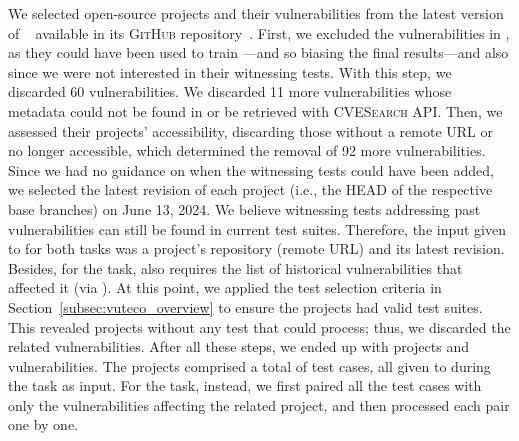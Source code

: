 We selected open-source \Java projects and their vulnerabilities from the latest version of \projectKB~\cite{ponta:msr2019:projectkb} available in its \textsc{GitHub} repository~\cite{projectkb:github}.
First, we excluded the vulnerabilities in \VulforJ, as they could have been used to train \vuteco---and so biasing the final results---and also since we were not interested in their witnessing tests.
With this step, we discarded 60 vulnerabilities.
We discarded 11 more vulnerabilities whose metadata could not be found in \projectKB or be retrieved with \textsc{CVESearch} API.
Then, we assessed their projects' accessibility, discarding those without a remote URL or no longer accessible, which determined the removal of 92 more vulnerabilities.
%
Since we had no guidance on when the witnessing tests could have been added, we selected the latest revision of each project (i.e., the HEAD of the respective base branches) on June 13, 2024.
We believe witnessing tests addressing past vulnerabilities can still be found in current test suites.
Therefore, the input given to \vuteco for both tasks was a project's repository (remote URL) and its latest revision.
Besides, for the \matching task, \vuteco also requires the list of historical vulnerabilities that affected it (via \projectKB).
%
At this point, we applied the test selection criteria in Section~\ref{subsec:vuteco_overview} to ensure the projects had valid test suites.
This revealed \invivoProjectsWithNoTests projects without any test that \vuteco could process; thus, we discarded the related \vulnsWithNoTests vulnerabilities.
%
After all these steps, we ended up with \invivoProjects projects and \invivoVulns vulnerabilities.
%
The \invivoProjects projects comprised a total of \invivoTests test cases, all given to \vuteco during the \finding task as input.
For the \matching task, instead, we first paired all the test cases with only the vulnerabilities affecting the related project, and then \vuteco processed each pair one by one.

